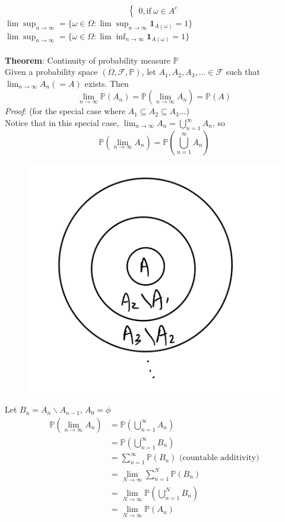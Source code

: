 \documentclass[11pt]{article}
\begin{document}
\begin{enumerate}
\begin{equation}
\begin{cases}
0, \text{if}\ \omega \in A^{c}
\end{cases}
\end{equation}
$\lim \sup _{n \rightarrow \infty} = \{ \omega \in \Omega : \lim \sup _{n \rightarrow \infty} \textbf{1}_{A(\omega)} = 1\}$\\
$\lim \sup _{n \rightarrow \infty} = \{ \omega \in \Omega : \lim \inf _{n \rightarrow \infty} \textbf{1}_{A(\omega)} = 1\}$\\\\
\textbf{Theorem}: Continuity of probability measure $\mathbb{P}$\\
Given a probability space $(\Omega , \mathcal{F}, \mathbb{P})$, let $A_1 , A_2 , A_3 , ... \in \mathcal{F}$ such that $\lim_{n \rightarrow \infty} A_n (= A)$ exists. Then $$\lim_{n \rightarrow \infty} \mathbb{P}(A_n) = \mathbb{P}(\lim _{n \rightarrow \infty} A_n) = \mathbb{P}(A)$$
\textit{Proof}: (for the special case where $A_1 \subseteq A_2 \subseteq A_3 ...$)\\
Notice that in this special case, $\lim _{n \rightarrow \infty} A_n = \bigcup _{n=1}^{\infty} A_n$, so\\
$$\mathbb{P}(\lim _{n \rightarrow \infty} A_n)= \mathbb{P} (\bigcup _{n=1}^{\infty} A_n)$$
\begin{figure}[H]
\centering
\includegraphics[width = 0.25 \linewidth]{images/1.jpeg} 
\end{figure}
Let $B_n = A_n \backslash A_{n-1}$, $A_0 = \phi$
\begin{align*}
\mathbb{P}(\lim _{n \rightarrow \infty} A_n) &= \mathbb{P} (\bigcup _{n=1}^{\infty} A_n)\\
&= \mathbb{P}(\bigcup _{n=1}^{\infty} B_n)\\
&= \sum_{n=1}^{\infty} \mathbb{P}(B_n) \text{ (countable additivity)}\\
&= \lim _{N \rightarrow \infty} \sum_{n=1}^{N} \mathbb{P}(B_n) \\
&= \lim _{N \rightarrow \infty} \mathbb{P}(\bigcup _{n=1}^{N} B_n)\\
&= \lim _{N \rightarrow \infty} \mathbb{P}(A_n)
\end{align*}
\end{enumerate}
\newpage
\end{document}
